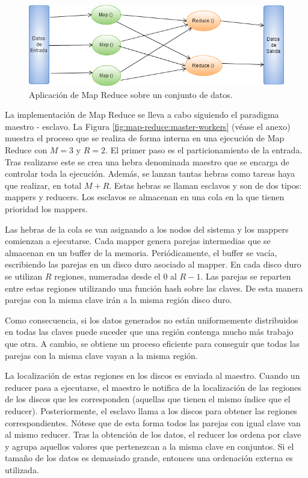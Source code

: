 \documentclass[10pt]{article}
\begin{document}
		\begin{figure}[H]
			\centering
			\includegraphics[width=14cm]{./images/MapReduce.png}
			\caption{Aplicación de Map Reduce sobre un conjunto de datos.} 
			\label{fig:map-reduce}
		\end{figure}

		La implementación de Map Reduce se lleva a cabo siguiendo el paradigma maestro - esclavo. La Figura \ref{fig:map-reduce:master-workers} (véase el anexo) muestra el proceso que se realiza de forma interna en una ejecución de Map Reduce con $M=3$ y $R=2$. El primer paso es el particionamiento de la entrada. Tras realizarse este se crea una hebra denominada maestro que se encarga de controlar toda la ejecución. Además, se lanzan tantas hebras como tareas haya que realizar, en total $M+R$. Estas hebras se llaman esclavos y son de dos tipos: mappers y reducers. Los esclavos se almacenan en una cola en la que tienen prioridad los mappers.
		
		Las hebras de la cola se van asignando a los nodos del sistema y los mappers comienzan a ejecutarse. Cada mapper genera parejas intermedias que se almacenan en un buffer de la memoria. Periódicamente, el buffer se vacía, escribiendo las parejas en un disco duro asociado al mapper. En cada disco duro se utilizan $R$ regiones, numeradas desde el $0$ al $R-1$. Las parejas se reparten entre estas regiones utilizando una función hash sobre las claves. De esta manera parejas con la misma clave irán a la misma región disco duro. 

		Como consecuencia, si los datos generados no están uniformemente distribuidos en todas las claves puede suceder que una región contenga mucho más trabajo que otra. A cambio, se obtiene un proceso eficiente para conseguir que todas las parejas con la misma clave vayan a la misma región.
		
		La localización de estas regiones en los discos es enviada al maestro. Cuando un reducer pasa a ejecutarse, el maestro le notifica de la localización de las regiones de los discos que les corresponden (aquellas que tienen el mismo índice que el reducer). Posteriormente, el esclavo llama a los discos para obtener las regiones correspondientes. Nótese que de esta forma todos las parejas con igual clave van al mismo reducer. Tras la obtención de los datos, el reducer los ordena por clave y agrupa aquellos valores que pertenezcan a la misma clave en conjuntos. Si el tamaño de los datos es demasiado grande, entonces una ordenación externa es utilizada.
		
\end{document}
